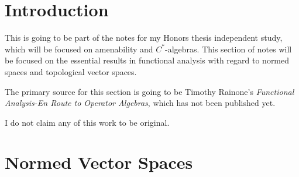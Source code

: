 \documentclass[10pt]{mypackage}
\begin{document}
\RaggedRight
\tableofcontents
\section{Introduction}%
This is going to be part of the notes for my Honors thesis independent study, which will be focused on amenability and $C^{\ast}$-algebras. This section of notes will be focused on the essential results in functional analysis with regard to normed spaces and topological vector spaces.

The primary source for this section is going to be Timothy Rainone's \textit{Functional Analysis-En Route to Operator Algebras}, which has not been published yet.\newline

I do not claim any of this work to be original.
\section{Normed Vector Spaces}%
\end{document}
